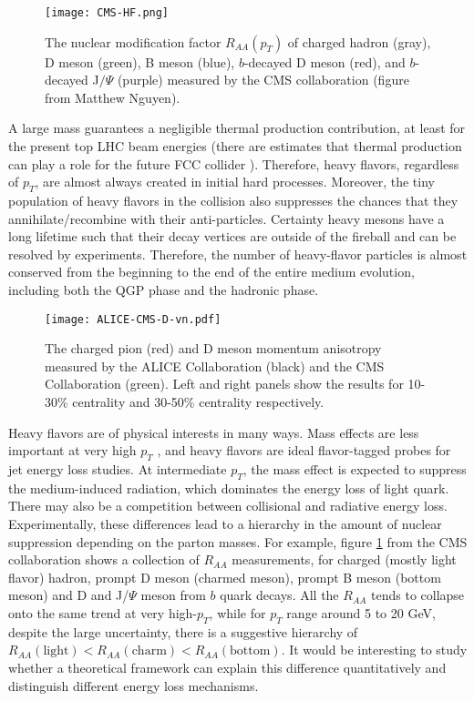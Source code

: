 \begin{figure}
\singlespacing 
\centering
\texttt{[image: CMS-HF.png]}
\caption[The nuclear modification factor $R_{AA}(p_T)$ of charged hadron (gray),]{The nuclear modification factor $R_{AA}(p_T)$ of charged hadron (gray), D meson (green), B meson (blue), $b$-decayed D meson (red), and $b$-decayed J$/\Psi$ (purple) measured by the CMS collaboration \cite{Khachatryan:2016odn,Sirunyan:2017isk,Sirunyan:2017xss,Sirunyan:2017oug} (figure from Matthew Nguyen).}
\label{fig:intro:Raa}
\end{figure}

A large mass guarantees a negligible thermal production contribution, at least for the present top LHC beam energies (there are estimates that thermal production can play a role for the future FCC collider \cite{Zhou:2016wbo}).
Therefore, heavy flavors, regardless of $p_T$, are almost always created in initial hard processes.
Moreover, the tiny population of heavy flavors in the collision also suppresses the chances that they annihilate/recombine with their anti-particles.
Certainty heavy mesons have a long lifetime such that their decay vertices are outside of the fireball and can be resolved by experiments.
Therefore, the number of heavy-flavor particles is almost conserved from the beginning to the end of the entire medium evolution, including both the QGP phase and the hadronic phase.

\begin{figure}
\singlespacing 
\centering
\texttt{[image: ALICE-CMS-D-vn.pdf]}
\caption[The charged pion (red) and D meson momentum anisotropy]{The charged pion (red) and D meson momentum anisotropy measured by the ALICE Collaboration (black) and the CMS Collaboration (green). Left and right panels show the results for 10-30\% centrality and 30-50\% centrality respectively.}
\label{fig:intro:D-vn}
\end{figure}

Heavy flavors are of physical interests in many ways.
Mass effects are less important at very high $p_T$ , and heavy flavors are ideal flavor-tagged probes for jet energy loss studies.
At intermediate $p_T$, the mass effect is expected to suppress the medium-induced radiation, which dominates the energy loss of light quark.
There may also be a competition between collisional and radiative energy loss.
Experimentally, these differences lead to a hierarchy in the amount of nuclear suppression depending on the parton masses.
For example, figure \ref{fig:intro:Raa} from the CMS collaboration shows a collection of $R_{AA}$ measurements, for charged (mostly light flavor) hadron, prompt D meson (charmed meson), prompt B meson (bottom meson) and D and J/$\Psi$ meson from $b$ quark decays.
All the $R_{AA}$ tends to collapse onto the same trend at very high-$p_T$, while for $p_T$ range around 5 to 20 GeV, despite the large uncertainty, there is a suggestive hierarchy of $R_{AA}(\textrm{light}) < R_{AA}(\textrm{charm}) < R_{AA}(\textrm{bottom})$.
It would be interesting to study whether a theoretical framework can explain this difference quantitatively and distinguish different energy loss mechanisms.

